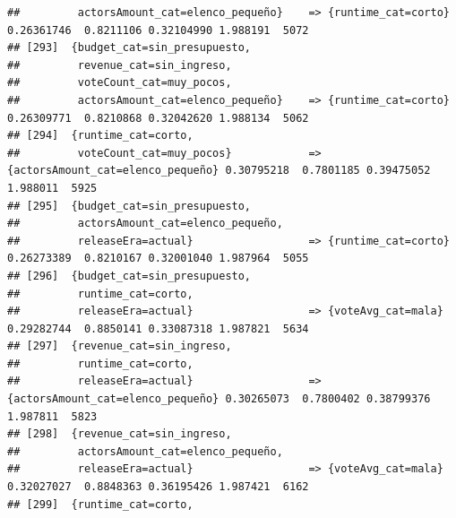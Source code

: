 \documentclass[
]{article}
\begin{document}
\begin{verbatim}
##         actorsAmount_cat=elenco_pequeño}    => {runtime_cat=corto}               0.26361746  0.8211106 0.32104990 1.988191  5072
## [293]  {budget_cat=sin_presupuesto,                                                                                             
##         revenue_cat=sin_ingreso,                                                                                                
##         voteCount_cat=muy_pocos,                                                                                                
##         actorsAmount_cat=elenco_pequeño}    => {runtime_cat=corto}               0.26309771  0.8210868 0.32042620 1.988134  5062
## [294]  {runtime_cat=corto,                                                                                                      
##         voteCount_cat=muy_pocos}            => {actorsAmount_cat=elenco_pequeño} 0.30795218  0.7801185 0.39475052 1.988011  5925
## [295]  {budget_cat=sin_presupuesto,                                                                                             
##         actorsAmount_cat=elenco_pequeño,                                                                                        
##         releaseEra=actual}                  => {runtime_cat=corto}               0.26273389  0.8210167 0.32001040 1.987964  5055
## [296]  {budget_cat=sin_presupuesto,                                                                                             
##         runtime_cat=corto,                                                                                                      
##         releaseEra=actual}                  => {voteAvg_cat=mala}                0.29282744  0.8850141 0.33087318 1.987821  5634
## [297]  {revenue_cat=sin_ingreso,                                                                                                
##         runtime_cat=corto,                                                                                                      
##         releaseEra=actual}                  => {actorsAmount_cat=elenco_pequeño} 0.30265073  0.7800402 0.38799376 1.987811  5823
## [298]  {revenue_cat=sin_ingreso,                                                                                                
##         actorsAmount_cat=elenco_pequeño,                                                                                        
##         releaseEra=actual}                  => {voteAvg_cat=mala}                0.32027027  0.8848363 0.36195426 1.987421  6162
## [299]  {runtime_cat=corto,                                                                                                      

\end{verbatim}
\end{document}
